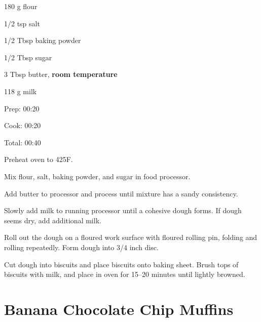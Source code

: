 \documentclass[oneside]{book}  %
\def\thisrecipe{}  %
\newcommand{\recipe}[1]{\section{#1}\def\thisrecipe{: #1}} %
\newcommand{\degF}{\textdegree F\xspace}
\begin{document}
\begin{IT}
  \begin{ingredients}
    \item[180 g] flour
    \item[1/2 tsp] salt
    \item[1/2 Tbsp] baking powder
    \item[1/2 Tbsp] sugar
    \item[3 Tbsp] butter, \textbf{room temperature}
    \item[118 g] milk
  \end{ingredients}

  \switchcolumn

  \begin{timeline}
    \item[Prep:]  00:20
    \item[Cook:]  00:20
    \item[Total:] 00:40
  \end{timeline}
\end{IT}

\begin{directions}
  \item Preheat oven to 425\degF.

  \item Mix flour, salt, baking powder, and sugar in food processor.

  \item Add butter to processor and process until mixture has a sandy
    consistency.

  \item Slowly add milk to running processor until a cohesive dough forms. If
    dough seems dry, add additional milk.

  \columnbreak

  \item Roll out the dough on a floured work surface with floured rolling pin,
    folding and rolling repeatedly. Form dough into 3/4 inch disc.

  \item Cut dough into biscuits and place biscuits onto baking sheet. Brush tops
    of biscuits with milk, and place in oven for 15--20 minutes until lightly
    browned.
\end{directions}
\recipe{Banana Chocolate Chip Muffins} \label{recipe:banana_chocolate_chip_muffins} %
\end{document}
